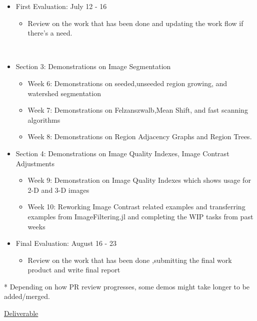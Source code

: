 \begin{itemize}[topsep=0]
\begin{itemize}
      \item \textsf{First Evaluation: July 12 - 16} 
      \begin{itemize}
          \item Review on the work that has been done and updating the work flow if there's a need.
      \end{itemize}
      \\
      \item \textsf{Section 3: Demonstrations on Image Segmentation}
      \begin{itemize}
          \item Week 6:  Demonstrations on seeded,unseeded region growing, and watershed segmentation
          \item Week 7: Demonstrations on Felzanszwalb,Mean Shift, and fast scanning algorithms
          \item Week 8: Demonstrations on Region Adjacency Graphs and Region Trees.
      \end{itemize}
      \item \textsf{Section 4: Demonstrations on Image Quality Indexes, Image Contrast Adjustments}
      \begin{itemize}
            \item Week 9: Demonstration on Image Quality Indexes which shows usage for 2-D and 3-D images
            \item Week 10: Reworking Image Contrast related examples and transferring examples from ImageFiltering.jl and completing the WIP tasks from past weeks 
      \end{itemize}


      \item \textsf{Final Evaluation: August 16 - 23 }
      \begin{itemize}
          \item Review on the work that has been done ,submitting the final work product and write final report 
      \end{itemize}
  \end{itemize}
  * Depending on how PR review progresses, some demos might take longer to be added/merged.
\end{itemize}

\vspace{0.2cm}
\Large
\underline{\textsf{Deliverable}}

